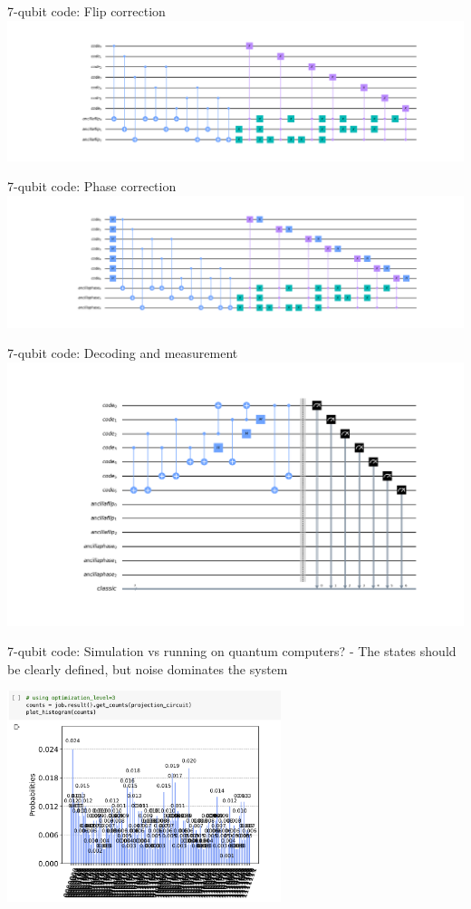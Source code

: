 \documentclass{beamer}
\begin{document}
\begin{frame}{7-qubit code: Flip correction}
  \includegraphics[width=\textwidth]{7qb_flip}
\end{frame}

\begin{frame}{7-qubit code: Phase correction}
  \includegraphics[width=\textwidth]{7qb_phase}
\end{frame}

\begin{frame}{7-qubit code: Decoding and measurement}
  \includegraphics[width=\textwidth]{7qb_end}
\end{frame}

\begin{frame}{7-qubit code: Simulation vs running on quantum computers?}
    - The states should be clearly defined, but noise dominates the system
    \begin{center}
        \includegraphics[width=8cm]{7-melbourne-fidelity}
    \end{center}
\end{frame}
\end{document}
